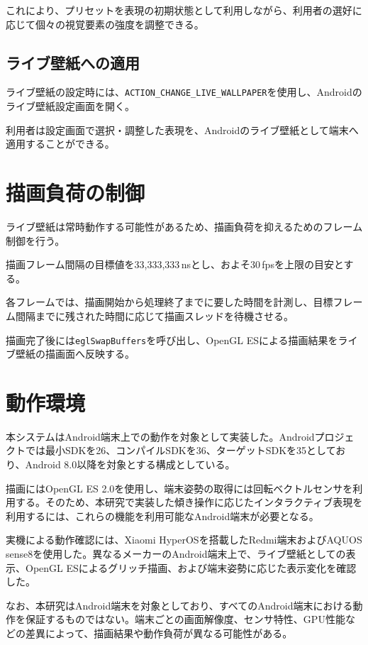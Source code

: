 これにより、プリセットを表現の初期状態として利用しながら、利用者の選好に応じて個々の視覚要素の強度を調整できる。


\subsection{ライブ壁紙への適用}

ライブ壁紙の設定時には、\texttt{ACTION\_CHANGE\_LIVE\_WALLPAPER}を使用し、Androidのライブ壁紙設定画面を開く。

利用者は設定画面で選択・調整した表現を、Androidのライブ壁紙として端末へ適用することができる。


\section{描画負荷の制御}

ライブ壁紙は常時動作する可能性があるため、描画負荷を抑えるためのフレーム制御を行う。

描画フレーム間隔の目標値を33,333,333\,nsとし、およそ30\,fpsを上限の目安とする。

各フレームでは、描画開始から処理終了までに要した時間を計測し、目標フレーム間隔までに残された時間に応じて描画スレッドを待機させる。

描画完了後には\texttt{eglSwapBuffers}を呼び出し、OpenGL ESによる描画結果をライブ壁紙の描画面へ反映する。


\section{動作環境}

本システムはAndroid端末上での動作を対象として実装した。Androidプロジェクトでは最小SDKを26、コンパイルSDKを36、ターゲットSDKを35としており、Android 8.0以降を対象とする構成としている。

描画にはOpenGL ES 2.0を使用し、端末姿勢の取得には回転ベクトルセンサを利用する。そのため、本研究で実装した傾き操作に応じたインタラクティブ表現を利用するには、これらの機能を利用可能なAndroid端末が必要となる。

実機による動作確認には、Xiaomi HyperOSを搭載したRedmi端末およびAQUOS sense8を使用した。異なるメーカーのAndroid端末上で、ライブ壁紙としての表示、OpenGL ESによるグリッチ描画、および端末姿勢に応じた表示変化を確認した。

なお、本研究はAndroid端末を対象としており、すべてのAndroid端末における動作を保証するものではない。端末ごとの画面解像度、センサ特性、GPU性能などの差異によって、描画結果や動作負荷が異なる可能性がある。
